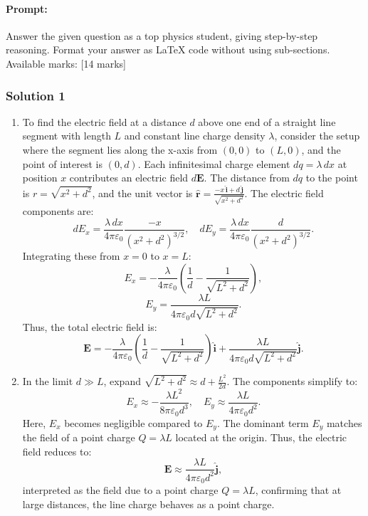 \documentclass{article}
\begin{document}
\paragraph{Prompt: \\} 
Answer the given question as a top physics student, giving step-by-step reasoning. Format your answer as LaTeX code without using sub-sections. Available marks: [14 marks]

\subsubsection{Solution 1}
\begin{enumerate}
    \item To find the electric field at a distance \( d \) above one end of a straight line segment with length \( L \) and constant line charge density \( \lambda \), consider the setup where the segment lies along the x-axis from \( (0,0) \) to \( (L,0) \), and the point of interest is \( (0,d) \). Each infinitesimal charge element \( dq = \lambda \, dx \) at position \( x \) contributes an electric field \( d\mathbf{E} \). The distance from \( dq \) to the point is \( r = \sqrt{x^2 + d^2} \), and the unit vector is \( \hat{\mathbf{r}} = \frac{-x \, \mathbf{\hat{i}} + d \, \mathbf{\hat{j}}}{\sqrt{x^2 + d^2}} \). The electric field components are:
    \[
    dE_x = \frac{\lambda \, dx}{4\pi\varepsilon_0} \frac{-x}{(x^2 + d^2)^{3/2}}, \quad
    dE_y = \frac{\lambda \, dx}{4\pi\varepsilon_0} \frac{d}{(x^2 + d^2)^{3/2}}.
    \]
    Integrating these from \( x = 0 \) to \( x = L \):
    \[
    E_x = -\frac{\lambda}{4\pi\varepsilon_0} \left( \frac{1}{d} - \frac{1}{\sqrt{L^2 + d^2}} \right),
    \]
    \[
    E_y = \frac{\lambda L}{4\pi\varepsilon_0 d \sqrt{L^2 + d^2}}.
    \]
    Thus, the total electric field is:
    \[
    \mathbf{E} = -\frac{\lambda}{4\pi\varepsilon_0} \left( \frac{1}{d} - \frac{1}{\sqrt{L^2 + d^2}} \right) \mathbf{\hat{i}} + \frac{\lambda L}{4\pi\varepsilon_0 d \sqrt{L^2 + d^2}} \mathbf{\hat{j}}.
    \]

    \item In the limit \( d \gg L \), expand \( \sqrt{L^2 + d^2} \approx d + \frac{L^2}{2d} \). The components simplify to:
    \[
    E_x \approx -\frac{\lambda L^2}{8\pi\varepsilon_0 d^3}, \quad
    E_y \approx \frac{\lambda L}{4\pi\varepsilon_0 d^2}.
    \]
    Here, \( E_x \) becomes negligible compared to \( E_y \). The dominant term \( E_y \) matches the field of a point charge \( Q = \lambda L \) located at the origin. Thus, the electric field reduces to:
    \[
    \mathbf{E} \approx \frac{\lambda L}{4\pi\varepsilon_0 d^2} \mathbf{\hat{j}},
    \]
    interpreted as the field due to a point charge \( Q = \lambda L \), confirming that at large distances, the line charge behaves as a point charge.
\end{enumerate}
\end{document}
